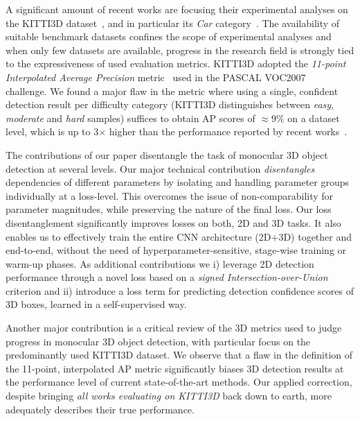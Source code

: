 \documentclass[10pt,twocolumn,letterpaper]{article}
\begin{document}
A significant amount of recent works are focusing their experimental analyses on the KITTI3D dataset~\cite{Geiger2012CVPR}, and in particular its \textit{Car} category~\cite{Manhardt_2019_CVPR,qin2019monogrnet,Roddick18,Xu_2018_CVPR}. The availability of suitable benchmark datasets confines the scope of experimental analyses and when only few datasets are available, progress in the research field is strongly tied to the expressiveness of used evaluation metrics. KITTI3D adopted the \textit{11-point Interpolated Average Precision} metric~\cite{Salton1986} used in the PASCAL VOC2007~\cite{Everingham2010} challenge. We found a major flaw in the metric where using a single, confident detection result per difficulty category (KITTI3D distinguishes between \textit{easy}, \textit{moderate} and \textit{hard} samples) suffices to obtain AP scores of $\approx9\%$ on a dataset level, which is up to 3$\times$ higher than the performance reported by recent works~\cite{NIPS2015_Chen,Chen_2016_CVPR,TongHe_2019_arxiv,Xu_2018_CVPR}. 

The contributions of our paper disentangle the task of monocular 3D object detection at several levels. Our major technical contribution \textit{disentangles} dependencies of different parameters by isolating and handling parameter groups individually at a loss-level. This overcomes the issue of non-comparability for parameter magnitudes, while preserving the nature of the final loss. Our loss disentanglement significantly improves losses on both, 2D and 3D tasks. It also enables us to effectively train the entire CNN architecture (2D+3D) together and end-to-end, without the need of hyperparameter-sensitive, stage-wise training or warm-up phases. As additional contributions we i) leverage 2D detection performance through a novel loss based on a \textit{signed Intersection-over-Union} criterion and ii) introduce a loss term for predicting detection confidence scores of 3D boxes, learned in a self-supervised way.

Another major contribution is a critical review of the 3D metrics used to judge progress in monocular 3D object detection, with particular focus on the predominantly used KITTI3D dataset. We observe that a flaw in the definition of the 11-point, interpolated AP metric significantly biases 3D detection results at the performance level of current state-of-the-art methods. Our applied correction, despite bringing \textit{all works evaluating on KITTI3D} back down to earth, more adequately describes their true performance. 
\end{document}
